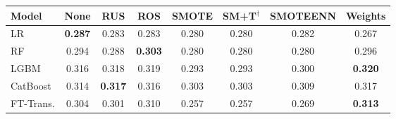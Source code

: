 \begin{tabular}{l c c c c c c c}
\toprule
Model & None & RUS & ROS & SMOTE & SM+T$^{\dagger}$ & SMOTEENN & Weights \\
\midrule
LR         & \textbf{0.287} & 0.283 & 0.283 & 0.280 & 0.280 & 0.282 & 0.267 \\
RF         & 0.294 & 0.288 & \textbf{0.303} & 0.280 & 0.280 & 0.280 & 0.296 \\
LGBM       & 0.316 & 0.318 & 0.319 & 0.293 & 0.293 & 0.300 & \textbf{0.320} \\
CatBoost   & 0.314 & \textbf{0.317} & 0.316 & 0.303 & 0.303 & 0.309 & 0.317 \\
FT-Trans.  & 0.304 & 0.301 & 0.310 & 0.257 & 0.257 & 0.269 & \textbf{0.313} \\
\bottomrule
\end{tabular}
